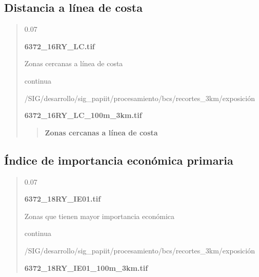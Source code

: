 \documentclass[letterpaper,10pt,spanish]{sphinxmanual}
\begin{document}
\subsection{Distancia a línea de costa}
\label{\detokenize{exposicion_bcs:distancia-a-linea-de-costa}}
\begin{quote}

 0.07

 {\color{red}\bfseries{}\textbar{}6372\_16RY\_LC.tif\textbar{}}

 Zonas cercanas a línea de costa

 continua


 /SIG/desarrollo/sig\_papiit/procesamiento/bcs/recortes\_3km/exposición

  {\color{red}\bfseries{}\textbar{}6372\_16RY\_LC\_100m\_3km.tif\textbar{}}
\begin{quote}

   {\color{red}\bfseries{}\textbar{}Zonas cercanas a línea de costa\textbar{}}
\end{quote}
\end{quote}


\subsection{Índice de importancia económica primaria}
\label{\detokenize{exposicion_bcs:indice-de-importancia-economica-primaria}}
\begin{quote}

 0.07

 {\color{red}\bfseries{}\textbar{}6372\_18RY\_IE01.tif\textbar{}}

 Zonas que tienen mayor importancia económica

 continua


 /SIG/desarrollo/sig\_papiit/procesamiento/bcs/recortes\_3km/exposición

  {\color{red}\bfseries{}\textbar{}6372\_18RY\_IE01\_100m\_3km.tif\textbar{}}
\begin{quote}

\end{quote}
\end{quote}
\end{document}
